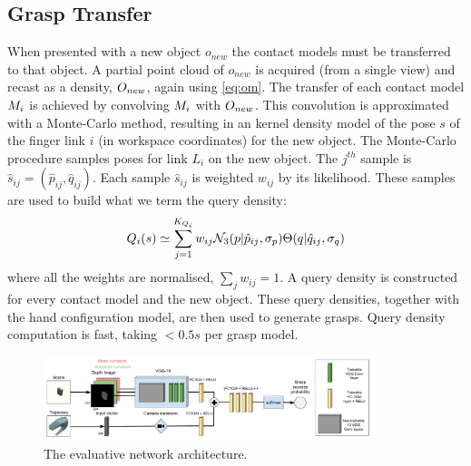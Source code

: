 \subsection{Grasp Transfer}
When presented with a new object $o_{new}$ the contact models must be transferred to that object. A partial point cloud of $o_{new}$ is acquired (from a single view) and recast as a density, $O_{new}$, again using \eq \ref{eq:om}. The transfer of each contact model $M_i$ is achieved by convolving $M_i$ with $O_{new}$. This convolution is approximated with a Monte-Carlo method, resulting in an kernel density model of the pose $s$ of the finger link $i$ (in workspace coordinates) for the new object. The Monte-Carlo procedure samples poses for link $L_i$ on the new object. The $j^{th}$ sample is $\hat{s}_{ij}=(\hat{p}_{ij},\hat{q}_{ij})$. Each sample $\hat{s}_{ij}$ is weighted $w_{ij}$ by its likelihood. These samples are used to build what we term the query density:
\begin{equation}
\qd_i(s) \simeq \sum^{K_{Q_i}}_{j=1} w_{ij} \mathcal{N}_3(p|{\hat{p}_{ij}}, \sigma_{p}) \Theta(q|{\hat{q}_{ij}}, \sigma_{q})%
\label{eq:qd.approx}
\end{equation}
where all the weights are normalised, $\sum_j w_{ij} = 1$. A query density is constructed for every contact model and the new object. These query densities, together with the hand configuration model, are then used to generate grasps. Query density computation is fast, taking $<0.5s$  per grasp model.
\begin{figure}[t]
\begin{center}
  \includegraphics[width=0.85\textwidth]{images/networkArchitecture.pdf}
  \end{center}
  \caption{The evaluative network architecture.}
\label{fig:networkArchitecture}
\end{figure}
